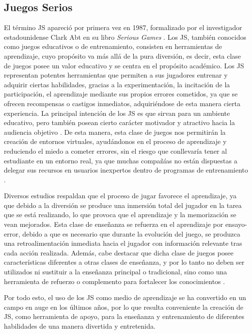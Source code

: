 \subsection{Juegos Serios}
\label{sec:JuegosSerios}
El término JS apareció por primera vez en 1987, formalizado por el investigador estadounidense Clark Abt en su libro \emph{Serious Games} \cite{abt1987serious}. Los JS, también conocidos como juegos educativos o de entrenamiento, consisten en herramientas de aprendizaje, cuyo propósito va más allá de la pura diversión, es decir, esta clase de juegos posee un valor educativo y se centra en el propósito académico. Los JS representan potentes herramientas que permiten a sus jugadores entrenar y adquirir ciertas habilidades, gracias a la experimentación, la incitación de la participación, el aprendizaje mediante sus propios errores cometidos, ya que se ofrecen recompensas o castigos inmediatos, adquiriéndose de esta manera cierta experiencia. La principal intención de los JS es que sirvan para un ambiente educativo, pero también posean cierto carácter motivador y atractivo hacia la audiencia objetivo \cite{frutos2015review, calderon2018multivocal, gallego2014panoramica}. De esta manera, esta clase de juegos nos permitirán la creación de entornos virtuales, ayudándonos en el proceso de aprendizaje y reduciendo el miedo a cometer errores, sin el riesgo que conllevaría tener al estudiante en un entorno real, ya que muchas compañías no están dispuestas a delegar sus recursos en usuarios inexpertos dentro de programas de entrenamiento \cite{monasor2010preparing}.

Diversos estudios respaldan que el proceso de jugar favorece el aprendizaje, ya que debido a la diversión se produce una inmersión total del jugador en la tarea que se está realizando, lo que provoca que el aprendizaje y la memorización se vean mejorados. Esta clase de enseñanza se refuerza en el aprendizaje por ensayo-error, debido a que es necesario que durante la evolución del juego, se produzca una retroalimentación inmediata hacia el jugador con información relevante tras cada acción realizada. Además, cabe destacar que dicha clase de juegos posee características diferentes a otras clases de enseñanza, y por lo tanto no deben ser utilizados ni sustituir a la enseñanza principal o tradicional, sino como una herramienta de refuerzo o complemento para fortalecer los conocimientos \cite{gallego2014panoramica}.

Por todo esto, el uso de los JS como medio de aprendizaje se ha convertido en un campo en auge en los últimos años, por lo que resulta conveniente la creación de JS, como herramienta de apoyo, para la enseñanza y entrenamiento de diferentes habilidades de una manera divertida y entretenida.

